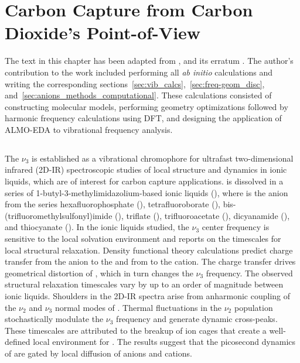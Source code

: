 \documentclass[%
  class = book,%
  crop = false,%
  float = true,%
  multi = true,%
  preview = false,%
]{standalone}
\begin{document}
\chapter[\texorpdfstring{\ce{CO2}}{CO2}-IL Cluster Model Development]{Carbon Capture from Carbon Dioxide's Point-of-View}
\label{ch:anions}

The text in this chapter has been adapted from , and its erratum . The author's contribution to the work included performing all \textit{ab initio} calculations and writing the corresponding sections~\ref{sec:vib_calcs},~\ref{sec:freq-geom_disc}, and~\ref{sec:anions_methods_computational}. These calculations consisted of constructing molecular models, performing geometry optimizations followed by harmonic frequency calculations using DFT, and designing the application of ALMO-EDA to vibrational frequency analysis.

\section{\texorpdfstring{}{Summary}}
\label{sec:anions_summary}

The  \(\nu_3\) \href{https://chemistry.stackexchange.com/q/45138/194}{\color{black}{asymmetric stretching mode}} is established as a vibrational chromophore for ultrafast two-dimensional infrared (2D-IR) spectroscopic studies of local structure and dynamics in ionic liquids, which are of interest for carbon capture applications.  is dissolved in a series of 1-butyl-3-methylimidazolium-based ionic liquids (\ce{[Im_{4,1}][X]}), where \ce{[X]-} is the anion from the series hexafluorophosphate (), tetrafluoroborate (), bis-(trifluoromethylsulfonyl)imide (), triflate (), trifluoroacetate (), dicyanamide (), and thiocyanate (). In the ionic liquids studied, the \(\nu_3\) center frequency is sensitive to the local solvation environment and reports on the timescales for local structural relaxation. Density functional theory calculations predict charge transfer from the anion to the  and from  to the cation. The charge transfer drives geometrical distortion of , which in turn changes the \(\nu_3\) frequency. The observed structural relaxation timescales vary by up to an order of magnitude between ionic liquids. Shoulders in the 2D-IR spectra arise from anharmonic coupling of the \(\nu_2\) and \(\nu_3\) normal modes of . Thermal fluctuations in the \(\nu_2\) population stochastically modulate the \(\nu_3\) frequency and generate dynamic cross-peaks. These timescales are attributed to the breakup of ion cages that create a well-defined local environment for . The results suggest that the picosecond dynamics of  are gated by local diffusion of anions and cations.
\end{document}
